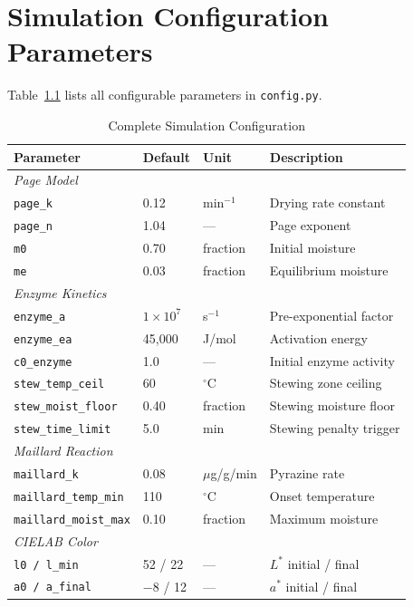 ﻿\documentclass[12pt, a4paper]{report}
\begin{document}
\chapter{Simulation Configuration Parameters}
Table~\ref{tab:full_config} lists all configurable parameters in \texttt{config.py}.

\begin{table}[H]
\centering
\caption{Complete Simulation Configuration}
\label{tab:full_config}
\footnotesize
\begin{tabular}{@{}llll@{}}
\toprule
\textbf{Parameter} & \textbf{Default} & \textbf{Unit} & \textbf{Description} \\
\midrule
\multicolumn{4}{l}{\textit{Page Model}} \\
\texttt{page\_k} & 0.12 & min$^{-1}$ & Drying rate constant \\
\texttt{page\_n} & 1.04 & --- & Page exponent \\
\texttt{m0} & 0.70 & fraction & Initial moisture \\
\texttt{me} & 0.03 & fraction & Equilibrium moisture \\
\midrule
\multicolumn{4}{l}{\textit{Enzyme Kinetics}} \\
\texttt{enzyme\_a} & $1 \times 10^7$ & s$^{-1}$ & Pre-exponential factor \\
\texttt{enzyme\_ea} & 45,000 & J/mol & Activation energy \\
\texttt{c0\_enzyme} & 1.0 & --- & Initial enzyme activity \\
\texttt{stew\_temp\_ceil} & 60 & $^\circ$C & Stewing zone ceiling \\
\texttt{stew\_moist\_floor} & 0.40 & fraction & Stewing moisture floor \\
\texttt{stew\_time\_limit} & 5.0 & min & Stewing penalty trigger \\
\midrule
\multicolumn{4}{l}{\textit{Maillard Reaction}} \\
\texttt{maillard\_k} & 0.08 & $\mu$g/g/min & Pyrazine rate \\
\texttt{maillard\_temp\_min} & 110 & $^\circ$C & Onset temperature \\
\texttt{maillard\_moist\_max} & 0.10 & fraction & Maximum moisture \\
\midrule
\multicolumn{4}{l}{\textit{CIELAB Color}} \\
\texttt{l0 / l\_min} & 52 / 22 & --- & $L^*$ initial / final \\
\texttt{a0 / a\_final} & $-8$ / 12 & --- & $a^*$ initial / final \\

\end{tabular}
\end{table}
\end{document}
